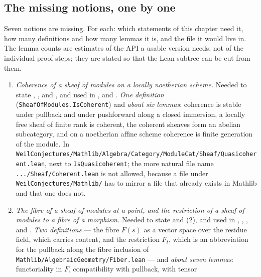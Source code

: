 \subsection*{The missing notions, one by one}

Seven notions are missing.  For each: which statements of this chapter need
it, how many definitions and how many lemmas it is, and the file it would live
in.  The lemma counts are estimates of the API a usable version needs, not of
the individual proof steps; they are stated so that the Lean subtree can be cut
from them.

\begin{enumerate}
  \item[(N1)] \emph{Coherence of a sheaf of modules on a locally noetherian
  scheme.}  Needed to state ,
  ,  and
  , and used in
  ,
   and
  .  \emph{One definition}
  (\texttt{SheafOfModules.IsCoherent}) and \emph{about six lemmas}: coherence
  is stable under pullback and under pushforward along a closed immersion, a
  locally free sheaf of finite rank is coherent, the coherent sheaves form an
  abelian subcategory, and on a noetherian affine scheme coherence is finite
  generation of the module.  In
  \texttt{WeilConjectures/Mathlib/Algebra/Category/ModuleCat/Sheaf/Quasicoherent.lean},
  next to \texttt{IsQuasicoherent}; the more natural file name
  \texttt{.../Sheaf/Coherent.lean} is not allowed, because a file under
  \texttt{WeilConjectures/Mathlib/} has to mirror a file that already exists in
  Mathlib and that one does not.
  \item[(N2)] \emph{The fibre of a sheaf of modules at a point, and the
  restriction of a sheaf of modules to a fibre of a morphism.}  Needed to
  state  and (2),
  and used in ,
  , ,
   and .  \emph{Two
  definitions} --- the fibre $F(s)$ as a vector space over the residue field,
  which carries content, and the restriction $F_t$, which is an abbreviation
  for the pullback along the fibre inclusion of
  \texttt{Mathlib/AlgebraicGeometry/Fiber.lean} --- and \emph{about seven
  lemmas}: functoriality in $F$, compatibility with pullback, with tensor

\end{enumerate}
